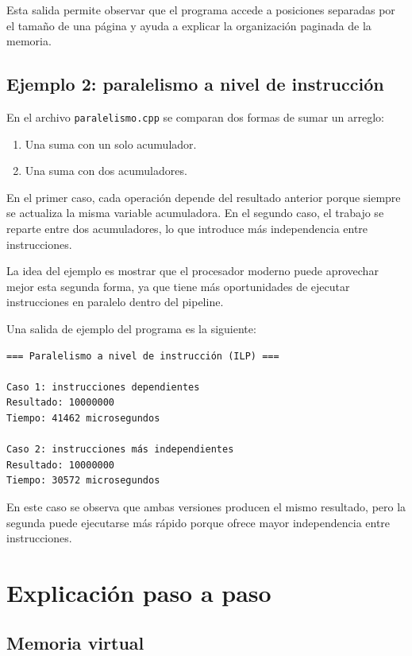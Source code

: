 \documentclass[11pt,a4paper]{article}
\begin{document}
Esta salida permite observar que el programa accede a posiciones separadas por el tamaño de una página y ayuda a explicar la organización paginada de la memoria.

\subsection{Ejemplo 2: paralelismo a nivel de instrucción}

En el archivo \texttt{paralelismo.cpp} se comparan dos formas de sumar un arreglo:

\begin{enumerate}
\item Una suma con un solo acumulador.
\item Una suma con dos acumuladores.
\end{enumerate}

En el primer caso, cada operación depende del resultado anterior porque siempre se actualiza la misma variable acumuladora. En el segundo caso, el trabajo se reparte entre dos acumuladores, lo que introduce más independencia entre instrucciones.

La idea del ejemplo es mostrar que el procesador moderno puede aprovechar mejor esta segunda forma, ya que tiene más oportunidades de ejecutar instrucciones en paralelo dentro del pipeline.

Una salida de ejemplo del programa es la siguiente:

\begin{verbatim}
=== Paralelismo a nivel de instrucción (ILP) ===

Caso 1: instrucciones dependientes
Resultado: 10000000
Tiempo: 41462 microsegundos

Caso 2: instrucciones más independientes
Resultado: 10000000
Tiempo: 30572 microsegundos
\end{verbatim}

En este caso se observa que ambas versiones producen el mismo resultado, pero la segunda puede ejecutarse más rápido porque ofrece mayor independencia entre instrucciones.

\section{Explicación paso a paso}

\subsection{Memoria virtual}
\end{document}
